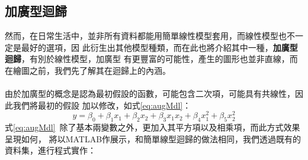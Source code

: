 		\subsection{加廣型迴歸}
		然而，在日常生活中，並非所有資料都能用簡單線性模型套用，而線性模型也不一定是最好的選項，因			此衍生出其他模型種類，而在此也將介紹其中一種，\textbf{加廣型迴歸}，有別於線性模型，加廣型			有更豐富的可能性，產生的圖形也並非直線，而在繪圖之前，我們先了解其在迴歸上的內涵。
		\\
		\\
		由於加廣型的概念是認為最初假設的函數，可能包含二次項，可能具有共線性，因此我們將最初的假設			加以修改，如式\ref{eq:augMdl}：
		\begin{equation}\label{eq:augMdl} 
		y=\beta_0+ \beta_1 x_1+\beta_2 x_2+\beta_3 x_1 x_2+\beta_4 x_1^2+\beta_5 				x_2^2
		\end{equation}
		式\ref{eq:augMdl}\ 除了基本兩變數之外，更加入其平方項以及相乘項，而此方式效果呈現如何，			將以MATLAB作展示，和簡單線型迴歸的做法相同，我們透過既有的資料集，進行程式實作：
		\bigskip
